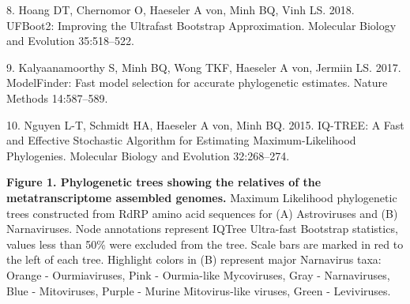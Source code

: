 \documentclass[11pt,]{article}
\begin{document}
\leavevmode\hypertarget{ref-hoang_ufboot2:_2018}{}%
8. Hoang DT, Chernomor O, Haeseler A von, Minh BQ, Vinh LS. 2018.
UFBoot2: Improving the Ultrafast Bootstrap Approximation. Molecular
Biology and Evolution 35:518--522.

\leavevmode\hypertarget{ref-kalyaanamoorthy_modelfinder:_2017}{}%
9. Kalyaanamoorthy S, Minh BQ, Wong TKF, Haeseler A von, Jermiin LS.
2017. ModelFinder: Fast model selection for accurate phylogenetic
estimates. Nature Methods 14:587--589.

\leavevmode\hypertarget{ref-nguyen_iq-tree:_2015}{}%
10. Nguyen L-T, Schmidt HA, Haeseler A von, Minh BQ. 2015. IQ-TREE: A
Fast and Effective Stochastic Algorithm for Estimating
Maximum-Likelihood Phylogenies. Molecular Biology and Evolution
32:268--274.

\newpage

\textbf{Figure 1. Phylogenetic trees showing the relatives of the
metatranscriptome assembled genomes.} Maximum Likelihood phylogenetic
trees constructed from RdRP amino acid sequences for (A) Astroviruses
and (B) Narnaviruses. Node annotations represent IQTree Ultra-fast
Bootstrap statistics, values less than 50\% were excluded from the tree.
Scale bars are marked in red to the left of each tree. Highlight colors
in (B) represent major Narnavirus taxa: Orange - Ourmiaviruses, Pink -
Ourmia-like Mycoviruses, Gray - Narnaviruses, Blue - Mitoviruses, Purple
- Murine Mitovirus-like viruses, Green - Leviviruses.
\end{document}
